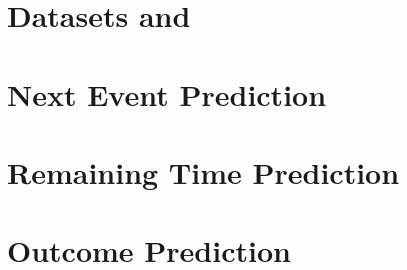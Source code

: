 

\section{Datasets and }

\section{Next Event Prediction}

\section{Remaining Time Prediction}

\section{Outcome Prediction}

